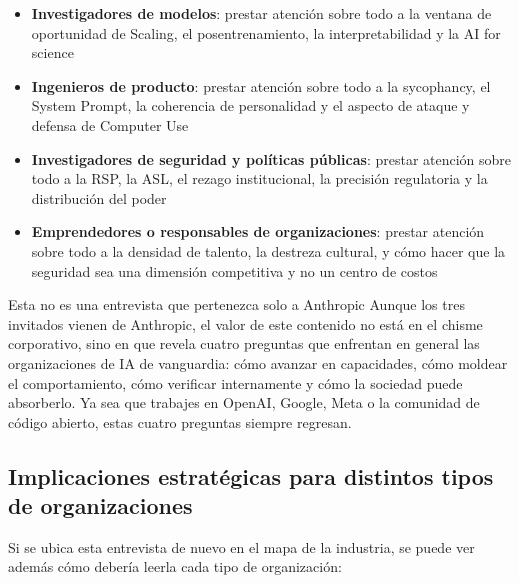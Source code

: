 \documentclass[a4paper]{article}
\begin{document}
\begin{itemize}
    \item \textbf{Investigadores de modelos}: prestar atención sobre todo a la ventana de oportunidad de Scaling, el posentrenamiento, la interpretabilidad y la AI for science
    \item \textbf{Ingenieros de producto}: prestar atención sobre todo a la sycophancy, el System Prompt, la coherencia de personalidad y el aspecto de ataque y defensa de Computer Use
    \item \textbf{Investigadores de seguridad y políticas públicas}: prestar atención sobre todo a la RSP, la ASL, el rezago institucional, la precisión regulatoria y la distribución del poder
    \item \textbf{Emprendedores o responsables de organizaciones}: prestar atención sobre todo a la densidad de talento, la destreza cultural, y cómo hacer que la seguridad sea una dimensión competitiva y no un centro de costos
\end{itemize}

\begin{importantbox}{Esta no es una entrevista que pertenezca solo a Anthropic}
Aunque los tres invitados vienen de Anthropic, el valor de este contenido no está en el chisme corporativo, sino en que revela cuatro preguntas que enfrentan en general las organizaciones de IA de vanguardia: cómo avanzar en capacidades, cómo moldear el comportamiento, cómo verificar internamente y cómo la sociedad puede absorberlo. Ya sea que trabajes en OpenAI, Google, Meta o la comunidad de código abierto, estas cuatro preguntas siempre regresan.
\end{importantbox}

\subsection{Implicaciones estratégicas para distintos tipos de organizaciones}

Si se ubica esta entrevista de nuevo en el mapa de la industria, se puede ver además cómo debería leerla cada tipo de organización:
\end{document}
